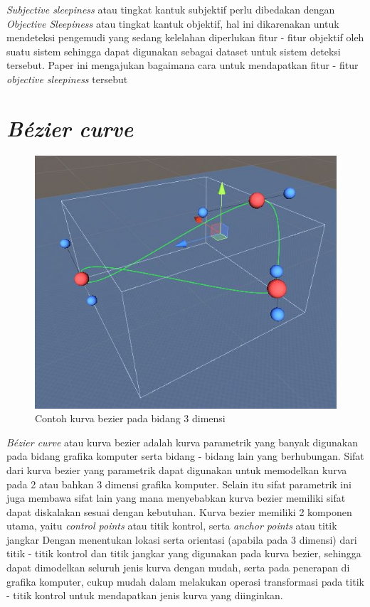 \textit{Subjective sleepiness} atau tingkat kantuk subjektif perlu dibedakan dengan \textit{Objective Sleepiness} atau tingkat kantuk objektif, hal ini dikarenakan untuk mendeteksi pengemudi yang sedang kelelahan diperlukan fitur - fitur objektif oleh suatu sistem sehingga dapat digunakan sebagai dataset untuk sistem deteksi tersebut. Paper ini mengajukan bagaimana cara untuk mendapatkan fitur - fitur \textit{objective sleepiness} tersebut\cite{cit:5}
\vspace{1ex}

\section{\textit{Bézier curve}}
\vspace{1ex}

\begin{figure} [!htb]
	\captionsetup{justification=centering}
	\includegraphics[scale=0.4]{img/contoh-kurva-bezier.JPG}
	\caption{Contoh kurva bezier pada bidang 3 dimensi}
	\label{fig:2.1}
\end{figure}

\textit{Bézier curve} atau kurva bezier adalah kurva parametrik yang banyak digunakan pada bidang grafika komputer serta bidang - bidang lain yang berhubungan. Sifat dari kurva bezier yang parametrik dapat digunakan untuk memodelkan kurva pada 2 atau bahkan 3 dimensi grafika komputer. Selain itu sifat parametrik ini juga membawa sifat lain yang mana menyebabkan kurva bezier memiliki sifat dapat diskalakan sesuai dengan kebutuhan. Kurva bezier memiliki 2 komponen utama, yaitu \textit{control points} atau titik kontrol, serta \textit{anchor points} atau titik jangkar Dengan menentukan lokasi serta orientasi (apabila pada 3 dimensi) dari titik - titik kontrol dan titik jangkar yang digunakan pada kurva bezier, sehingga dapat dimodelkan seluruh jenis kurva dengan mudah, serta pada penerapan di grafika komputer, cukup mudah dalam melakukan operasi transformasi pada titik - titik kontrol untuk mendapatkan jenis kurva yang diinginkan.\cite{cit:9}

